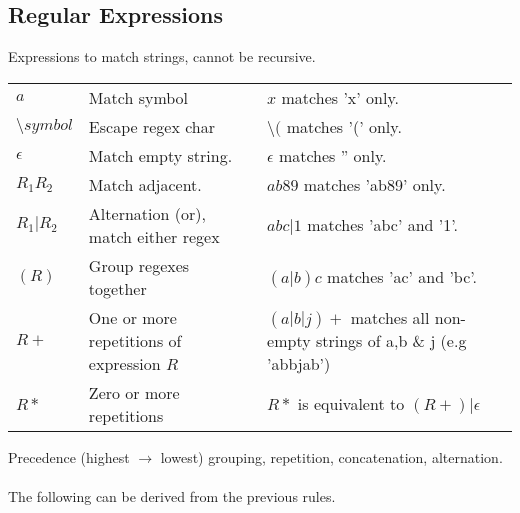 \documentclass{report}
\begin{document}
\subsection*{Regular Expressions}
Expressions to match strings, cannot be recursive.
\begin{center}
	\begin{tabular}{l l l}
		$a$                           & Match symbol                              & $x$ matches 'x' only.                                               \\
		$\text{\textbackslash}symbol$ & Escape regex char                         & $\text{\textbackslash}($ matches '(' only.                          \\
		$\epsilon$                    & Match empty string.                       & $\epsilon$ matches '' only.                                         \\
		$R_1R_2$                      & Match adjacent.                           & $ab89$ matches 'ab89' only.                                         \\
		$R_1|R_2$                     & Alternation (or), match either regex      & $abc|1$ matches 'abc' and '1'.                                      \\
		$(R)$                         & Group regexes together                    & $(a|b)c$ matches 'ac' and 'bc'.                                     \\
		$R+$                          & One or more repetitions of expression $R$ & $(a|b|j)+$ matches all non-empty strings of a,b \& j (e.g 'abbjab') \\
		$R*$                          & Zero or more repetitions                  & $R*$ is equivalent to $(R+)|\epsilon$                               \\
	\end{tabular}
\end{center}
Precedence (highest $\to$ lowest) grouping, repetition, concatenation, alternation.
\\
\\ The following can be derived from the previous rules.
\end{document}
